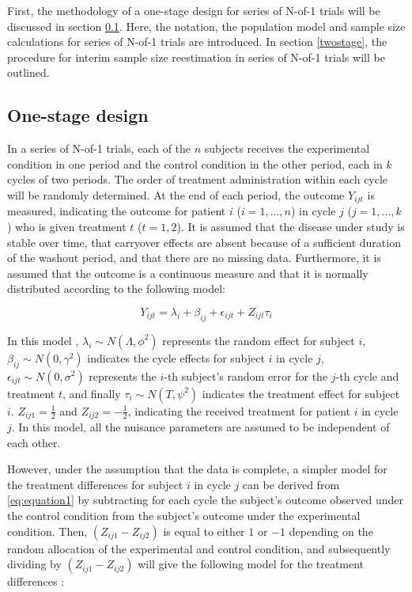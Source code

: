 \documentclass[AMA,STIX1COL,]{WileyNJD-v2}
\begin{document}
First, the methodology of a one-stage design for series of N-of-1 trials will be discussed in section \ref{onestage}. Here, the notation, the population model and sample size calculations for series of N-of-1 trials are introduced. In section \ref{twostage}, the procedure for interim sample size reestimation in series of N-of-1 trials will be outlined.

\hypertarget{onestage}{%
\subsection{One-stage design}\label{onestage}}

In a series of N-of-1 trials, each of the \(n\) subjects receives the experimental condition in one period and the control condition in the other period, each in \(k\) cycles of two periods. The order of treatment administration within each cycle will be randomly determined. At the end of each period, the outcome \(Y_{ijt}\) is measured, indicating the outcome for patient \(i\) (\(i = 1, ..., n\)) in cycle \(j\) (\(j = 1, ..., k\)) who is given treatment \(t\) (\(t = 1, 2\)). It is assumed that the disease under study is stable over time, that carryover effects are absent because of a sufficient duration of the washout period, and that there are no missing data. Furthermore, it is assumed that the outcome is a continuous measure and that it is normally distributed according to the following model:

\begin{equation} \label{eq:equation1}
Y_{ijt} = \lambda_i + \beta_{ij} + \epsilon_{ijt} + Z_{ijt}\tau_i
\end{equation}

In this model \citep{araujo2016}, \(\lambda_i \sim N(\Lambda, \phi^2)\) represents the random effect for subject \(i\), \(\beta_{ij} \sim N(0, \gamma^2)\) indicates the cycle effects for subject \(i\) in cycle \(j\), \(\epsilon_{ijt} \sim N(0, \sigma^2)\) represents the \(i\)-th subject's random error for the \(j\)-th cycle and treatment \(t\), and finally \(\tau_i \sim N(T, \psi^2)\) indicates the treatment effect for subject \(i\). \(Z_{ij1} = \frac{1}{2}\) and \(Z_{ij2} = -\frac{1}{2}\), indicating the received treatment for patient \(i\) in cycle \(j\). In this model, all the nuisance parameters are assumed to be independent of each other.

However, under the assumption that the data is complete, a simpler model for the treatment differences for subject \(i\) in cycle \(j\) can be derived from \eqref{eq:equation1} by subtracting for each cycle the subject's outcome observed under the control condition from the subject's outcome under the experimental condition. Then, \((Z_{ij1} - Z_{ij2})\) is equal to either \(1\) or \(-1\) depending on the random allocation of the experimental and control condition, and subsequently dividing by \((Z_{ij1} - Z_{ij2})\) will give the following model for the treatment differences \citep{araujo2016}:
\end{document}
